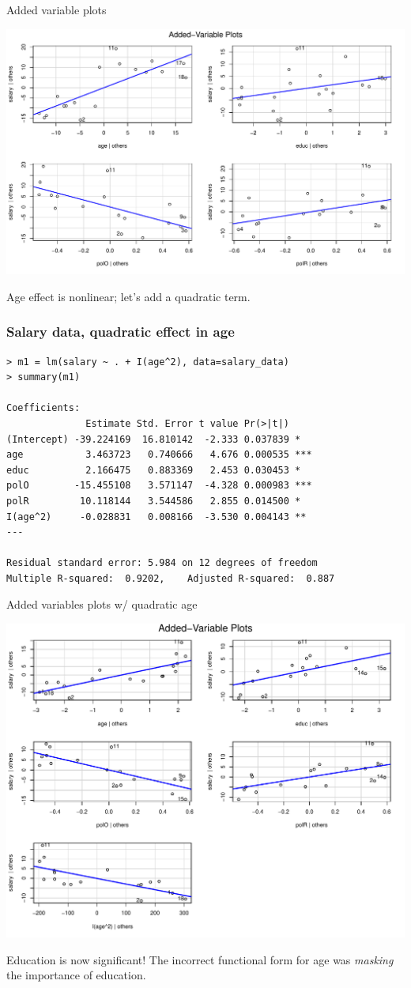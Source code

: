 \documentclass{beamer}
\begin{document}
\begin{frame}{Added variable plots}
\centerline{\includegraphics[height=0.7\textheight]{plots/salary_av.pdf}}

\pause Age effect is nonlinear; let's add a quadratic term.
\end{frame}

\begin{frame}[fragile]
\frametitle{Salary data, quadratic effect in age}
\begin{verbatim}
> m1 = lm(salary ~ . + I(age^2), data=salary_data)
> summary(m1)

Coefficients:
              Estimate Std. Error t value Pr(>|t|)    
(Intercept) -39.224169  16.810142  -2.333 0.037839 *  
age           3.463723   0.740666   4.676 0.000535 ***
educ          2.166475   0.883369   2.453 0.030453 *  
polO        -15.455108   3.571147  -4.328 0.000983 ***
polR         10.118144   3.544586   2.855 0.014500 *  
I(age^2)     -0.028831   0.008166  -3.530 0.004143 ** 
---

Residual standard error: 5.984 on 12 degrees of freedom
Multiple R-squared:  0.9202,	Adjusted R-squared:  0.887 
\end{verbatim}
\end{frame}

\begin{frame}{Added variables plots w/ quadratic age}
\centerline{\includegraphics[width=.75\textwidth]{plots/salary_av2.pdf}}
Education is now significant! \pause The incorrect
functional form for age was \textit{masking} the
importance of education.
\end{frame}
\end{document}
